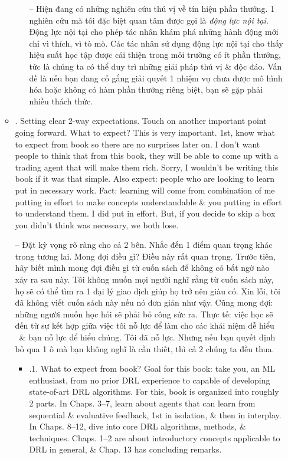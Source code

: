 \documentclass{article}
\begin{document}
\begin{itemize}
\begin{itemize}
\begin{itemize}
            -- Hiện đang có những nghiên cứu thú vị về tín hiệu phần thưởng. 1 nghiên cứu mà tôi đặc biệt quan tâm được gọi là {\it động lực nội tại}. Động lực nội tại cho phép tác nhân khám phá những hành động mới chỉ vì thích, vì tò mò. Các tác nhân sử dụng động lực nội tại cho thấy hiệu suất học tập được cải thiện trong môi trường có ít phần thưởng, tức là chúng ta có thể duy trì những giải pháp thú vị \& độc đáo. Vấn đề là nếu bạn đang cố gắng giải quyết 1 nhiệm vụ chưa được mô hình hóa hoặc không có hàm phần thưởng riêng biệt, bạn sẽ gặp phải nhiều thách thức.
        \end{itemize}
        \item {. Setting clear 2-way expectations.} Touch on another important point going forward. What to expect? This is very important. 1st, know what to expect from book so there are no surprises later on. I don't want people to think that from this book, they will be able to come up with a trading agent that will make them rich. Sorry, I wouldn't be writing this book if it was that simple. Also expect: people who are looking to learn put in necessary work. Fact: learning will come from combination of me putting in effort to make concepts understandable \& you putting in effort to understand them. I did put in effort. But, if you decide to skip a box you didn't think was necessary, we both lose.

        -- {\sf Đặt kỳ vọng rõ ràng cho cả 2 bên.} Nhắc đến 1 điểm quan trọng khác trong tương lai. Mong đợi điều gì? Điều này rất quan trọng. Trước tiên, hãy biết mình mong đợi điều gì từ cuốn sách để không có bất ngờ nào xảy ra sau này. Tôi không muốn mọi người nghĩ rằng từ cuốn sách này, họ sẽ có thể tìm ra 1 đại lý giao dịch giúp họ trở nên giàu có. Xin lỗi, tôi đã không viết cuốn sách này nếu nó đơn giản như vậy. Cũng mong đợi: những người muốn học hỏi sẽ phải bỏ công sức ra. Thực tế: việc học sẽ đến từ sự kết hợp giữa việc tôi nỗ lực để làm cho các khái niệm dễ hiểu \ \& bạn nỗ lực để hiểu chúng. Tôi đã nỗ lực. Nhưng nếu bạn quyết định bỏ qua 1 ô mà bạn không nghĩ là cần thiết, thì cả 2 chúng ta đều thua.
        \begin{itemize}
            \item {.1. What to expect from book?} Goal for this book: take you, an ML enthusiast, from no prior DRL experience to capable of developing state-of-art DRL algorithms. For this, book is organized into roughly 2 parts. In Chaps. 3--7, learn about agents that can learn from sequential \& evaluative feedback, 1st in isolation, \& then in interplay. In Chaps. 8--12, dive into core DRL algorithms, methods, \& techniques. Chaps. 1--2 are about introductory concepts applicable to DRL in general, \& Chap. 13 has concluding remarks.


\end{itemize}
\end{itemize}
\end{itemize}
\end{document}
